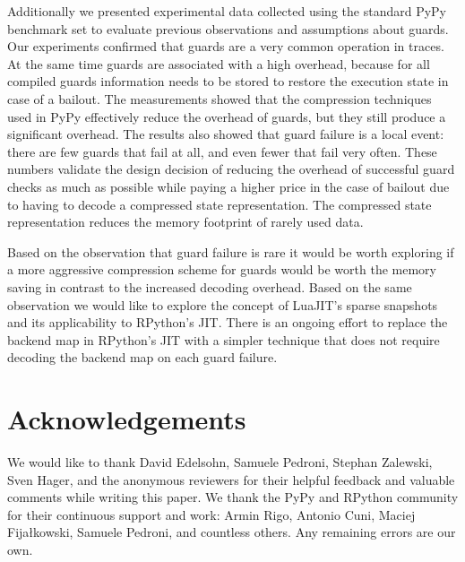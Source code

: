 \documentclass[10pt,preprint]{sigplanconf}
\begin{document}
Additionally we presented experimental data collected using the standard PyPy
benchmark set to evaluate previous observations and assumptions about guards. Our
experiments confirmed that guards are a very common
operation in traces. At the same time guards are associated with a high
overhead, because for all compiled guards information needs to be
stored to restore the execution state in case of a bailout. The measurements
showed that the compression techniques used in PyPy effectively reduce the
overhead of guards, but they still produce a significant overhead. The results
also showed that guard failure is a local event: there are few
guards that fail at all, and even fewer that fail very often.
These numbers validate the design decision of reducing the overhead of
successful guard checks as much as possible while paying a higher price in the
case of bailout due to having to decode a compressed state representation.
The compressed state representation reduces the memory footprint of rarely
used data.

Based on the observation that guard failure is rare it
would be worth exploring if a more aggressive compression scheme for guards
would be worth the memory saving in contrast to the increased decoding
overhead. Based on the same observation we would like to explore the concept of
LuaJIT's sparse snapshots and its applicability to RPython's JIT.
There is an ongoing effort to replace the backend map in RPython's JIT with a
simpler technique that does not require decoding the backend map on each guard
failure.

\section*{Acknowledgements}
We would like to thank David Edelsohn, Samuele Pedroni, Stephan Zalewski, Sven
Hager, and the anonymous reviewers for their helpful
feedback and valuable comments while writing this paper.
We thank the PyPy and RPython community for their continuous support and work:
Armin Rigo, Antonio Cuni, Maciej Fijałkowski, Samuele Pedroni, and countless
others. Any remaining errors are our own.



%    


\listoftodos
\end{document}
